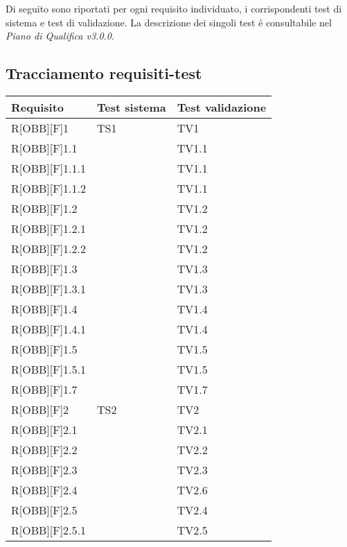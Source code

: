 Di seguito sono riportati per ogni requisito individuato, i corrispondenti test di sistema e test di validazione. La descrizione dei singoli test é consultabile nel \textit{Piano di Qualifica v3.0.0}.
\subsection{Tracciamento requisiti-test}
	\begin{table}[h]
		\begin{tabular}{|p{}|p{}|p{}|}
			\toprule
			
			\textbf{Requisito} & \textbf{Test sistema} & \textbf{Test validazione} \\
			
			\midrule

			R[OBB][F]1 & TS1 & TV1 \\ \midrule
			R[OBB][F]1.1 &  & TV1.1 \\ \midrule
			R[OBB][F]1.1.1 &  & TV1.1 \\ \midrule
			R[OBB][F]1.1.2 &  & TV1.1 \\ \midrule
			R[OBB][F]1.2 &  & TV1.2 \\ \midrule
			R[OBB][F]1.2.1 &  & TV1.2 \\ \midrule
			R[OBB][F]1.2.2 &  & TV1.2 \\ \midrule
			R[OBB][F]1.3 &  & TV1.3 \\ \midrule
			R[OBB][F]1.3.1 &  & TV1.3 \\ \midrule
			R[OBB][F]1.4 &  & TV1.4 \\ \midrule
			R[OBB][F]1.4.1 &  & TV1.4 \\ \midrule
			R[OBB][F]1.5 &  & TV1.5 \\ \midrule
			R[OBB][F]1.5.1 &  & TV1.5 \\ \midrule
			R[OBB][F]1.7 &  & TV1.7 \\ \midrule
			R[OBB][F]2 & TS2 & TV2 \\ \midrule
			R[OBB][F]2.1 &  & TV2.1 \\ \midrule
			R[OBB][F]2.2 &  & TV2.2 \\ \midrule
			R[OBB][F]2.3 &  & TV2.3 \\ \midrule
			R[OBB][F]2.4 &  & TV2.6 \\ \midrule
			R[OBB][F]2.5 &  & TV2.4 \\ \midrule
			R[OBB][F]2.5.1 &  & TV2.5 \\ \midrule
	
	\end{tabular}
	\end{table}
	\newpage
	

